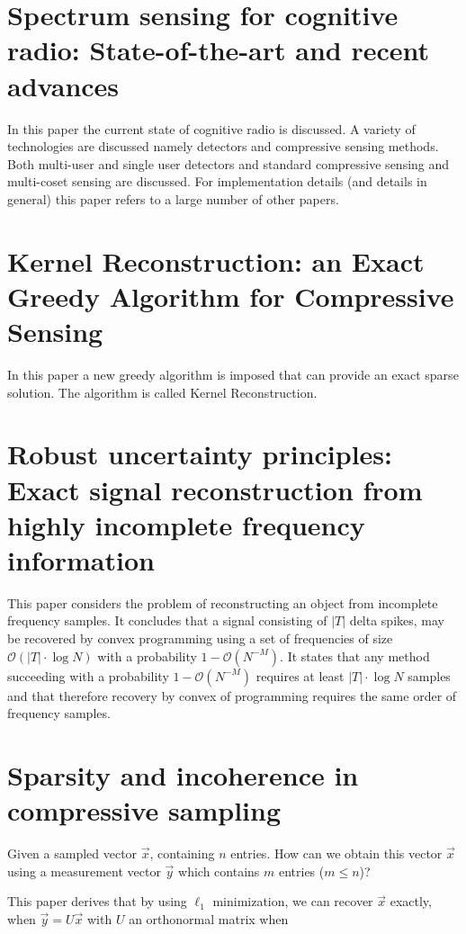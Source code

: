\documentclass[report, oneside, a4paper, openany]{memoir}
\begin{document}
\section{Spectrum sensing for cognitive radio: State-of-the-art and recent advances \cite{axell2012spectrum}}

In this paper the current state of cognitive radio is discussed. A variety of technologies are discussed namely detectors and compressive sensing methods. Both multi-user and single user detectors and standard compressive sensing and multi-coset sensing are discussed. For implementation details (and details in general) this paper refers to a large number of other papers.
\section{Kernel Reconstruction: an Exact Greedy Algorithm for Compressive Sensing \cite{bayarkernel}}

In this paper a new greedy algorithm is imposed that can provide an exact sparse solution. The algorithm is called Kernel Reconstruction.
\section{Robust uncertainty principles: Exact signal reconstruction from highly incomplete frequency information \cite{candes2006robust}}
This paper considers the problem of reconstructing an object from incomplete frequency samples. It concludes that a signal consisting of $|T|$ delta spikes, may be recovered by convex programming using a set of frequencies of size $\mathcal{O}(|T|\cdot \log N)$ with a probability $1-\mathcal{O}(N^{-M})$. It states that any method succeeding with a probability $1-\mathcal{O}(N^{-M})$ requires at least $|T|\cdot \log N$ samples and that therefore recovery by convex of programming requires the same order of frequency samples.
\section{Sparsity and incoherence in compressive sampling \cite{candes2007sparsity}}
%
Given a sampled vector $\vec{x}$, containing $n$ entries. How can we obtain this vector $\vec{x}$ using a measurement vector $\vec{y}$ which contains $m$ entries ($ m \leq n$)?

This paper derives that by using $\ell_1$ minimization, we can recover $\vec{x}$ exactly, when $\vec{y} = U\vec{x}$ with $U$ an orthonormal matrix when
\end{document}
